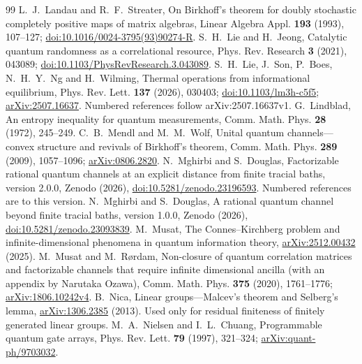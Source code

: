 \begin{thebibliography}{99}
 L.~J.~Landau and R.~F.~Streater,
On Birkhoff's theorem for doubly stochastic completely positive maps of matrix algebras,
Linear Algebra Appl. \textbf{193} (1993), 107--127;
\href{https://doi.org/10.1016/0024-3795(93)90274-R}{doi:10.1016/0024-3795(93)90274-R}.
 S.~H.~Lie and H.~Jeong,
Catalytic quantum randomness as a correlational resource,
Phys. Rev. Research \textbf{3} (2021), 043089;
\href{https://doi.org/10.1103/PhysRevResearch.3.043089}{doi:10.1103/PhysRevResearch.3.043089}.
 S.~H.~Lie, J.~Son, P.~Boes, N.~H.~Y.~Ng and H.~Wilming, Thermal operations from
informational equilibrium, Phys. Rev. Lett. \textbf{137} (2026), 030403; \href{https://doi.org/10.1103/lm3h-c5f5}{doi:10.1103/lm3h-c5f5}; \href{https://arxiv.org/abs/2507.16637}{arXiv:2507.16637}. Numbered references follow arXiv:2507.16637v1.
 G.~Lindblad, An entropy inequality for quantum measurements, Comm. Math. Phys. \textbf{28} (1972), 245--249.
 C.~B.~Mendl and M.~M.~Wolf, Unital quantum channels---convex structure and revivals of Birkhoff's theorem,
Comm. Math. Phys. \textbf{289} (2009), 1057--1096;
\href{https://arxiv.org/abs/0806.2820}{arXiv:0806.2820}.
 N.~Mghirbi and S.~Douglas, Factorizable rational quantum channels at an explicit distance from finite tracial baths,
version 2.0.0, Zenodo (2026), \href{https://doi.org/10.5281/zenodo.23196593}{doi:10.5281/zenodo.23196593}. Numbered references are to this version.
 N.~Mghirbi and S.~Douglas, A rational quantum channel beyond finite tracial baths, version 1.0.0, Zenodo (2026), \href{https://doi.org/10.5281/zenodo.23093839}{doi:10.5281/zenodo.23093839}.
 M.~Musat, The Connes--Kirchberg problem and infinite-dimensional phenomena in quantum information
theory, \href{https://arxiv.org/abs/2512.00432}{arXiv:2512.00432} (2025).
 M.~Musat and M.~R\o rdam,
Non-closure of quantum correlation matrices and factorizable channels that require infinite dimensional ancilla
(with an appendix by Narutaka Ozawa), Comm. Math. Phys. \textbf{375} (2020), 1761--1776;
\href{https://arxiv.org/abs/1806.10242v4}{arXiv:1806.10242v4}.
 B.~Nica, Linear groups---Malcev's theorem and Selberg's lemma,
\href{https://arxiv.org/abs/1306.2385}{arXiv:1306.2385} (2013). Used only for residual finiteness of finitely generated linear groups.
 M.~A.~Nielsen and I.~L.~Chuang, Programmable quantum gate arrays,
Phys. Rev. Lett. \textbf{79} (1997), 321--324; \href{https://arxiv.org/abs/quant-ph/9703032}{arXiv:quant-ph/9703032}.

\end{thebibliography}
